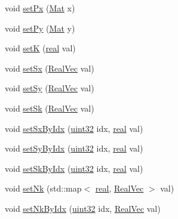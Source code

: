 \begin{DoxyCompactItemize}
\item 
void \mbox{\hyperlink{classvd_a579df0c885a43bb876449889bbcba6cb}{set\+Px}} (\mbox{\hyperlink{typedefs_8cpp_a9fa28c1f74e909474857584f5c7b0088}{Mat}} x)
\item 
void \mbox{\hyperlink{classvd_a8314de29eacf72f10afee2c67b0c9819}{set\+Py}} (\mbox{\hyperlink{typedefs_8cpp_a9fa28c1f74e909474857584f5c7b0088}{Mat}} y)
\item 
void \mbox{\hyperlink{classvd_a7c692a97b49c4596c4ec1bc0a129b516}{setK}} (\mbox{\hyperlink{typedefs_8cpp_a58a0c7cf2501f4492da833421be92547}{real}} val)
\item 
void \mbox{\hyperlink{classvd_af83b298bdb5fcc3dd0b87bb8ed68e4a1}{set\+Sx}} (\mbox{\hyperlink{typedefs_8cpp_a84b6d9a0fbb45e01ad4a3aa5667f2992}{Real\+Vec}} val)
\item 
void \mbox{\hyperlink{classvd_a04c6f1cda87a3d18d8dfd67b9bf5f843}{set\+Sy}} (\mbox{\hyperlink{typedefs_8cpp_a84b6d9a0fbb45e01ad4a3aa5667f2992}{Real\+Vec}} val)
\item 
void \mbox{\hyperlink{classvd_af12cf5f79bb162b5ac163fd666498c30}{set\+Sk}} (\mbox{\hyperlink{typedefs_8cpp_a84b6d9a0fbb45e01ad4a3aa5667f2992}{Real\+Vec}} val)
\item 
void \mbox{\hyperlink{classvd_a440d47d94f489ceefa9037be51daef66}{set\+Sx\+By\+Idx}} (\mbox{\hyperlink{typedefs_8cpp_a8ad23e2333787a214e20a58a284a5a60}{uint32}} idx, \mbox{\hyperlink{typedefs_8cpp_a58a0c7cf2501f4492da833421be92547}{real}} val)
\item 
void \mbox{\hyperlink{classvd_a5407f9c20ed4ff2300ccbebb999d1dde}{set\+Sy\+By\+Idx}} (\mbox{\hyperlink{typedefs_8cpp_a8ad23e2333787a214e20a58a284a5a60}{uint32}} idx, \mbox{\hyperlink{typedefs_8cpp_a58a0c7cf2501f4492da833421be92547}{real}} val)
\item 
void \mbox{\hyperlink{classvd_a578ca6980896563397214c584401c7f5}{set\+Sk\+By\+Idx}} (\mbox{\hyperlink{typedefs_8cpp_a8ad23e2333787a214e20a58a284a5a60}{uint32}} idx, \mbox{\hyperlink{typedefs_8cpp_a58a0c7cf2501f4492da833421be92547}{real}} val)
\item 
void \mbox{\hyperlink{classvd_aa1a3d9448f6ff6f8076b15c9e9a63d7e}{set\+Nk}} (std\+::map$<$ \mbox{\hyperlink{typedefs_8cpp_a58a0c7cf2501f4492da833421be92547}{real}}, \mbox{\hyperlink{typedefs_8cpp_a84b6d9a0fbb45e01ad4a3aa5667f2992}{Real\+Vec}} $>$ val)
\item 
void \mbox{\hyperlink{classvd_aa45da38425cbd5b48f61313323ba6204}{set\+Nk\+By\+Idx}} (\mbox{\hyperlink{typedefs_8cpp_a8ad23e2333787a214e20a58a284a5a60}{uint32}} idx, \mbox{\hyperlink{typedefs_8cpp_a84b6d9a0fbb45e01ad4a3aa5667f2992}{Real\+Vec}} val)

\end{DoxyCompactItemize}
